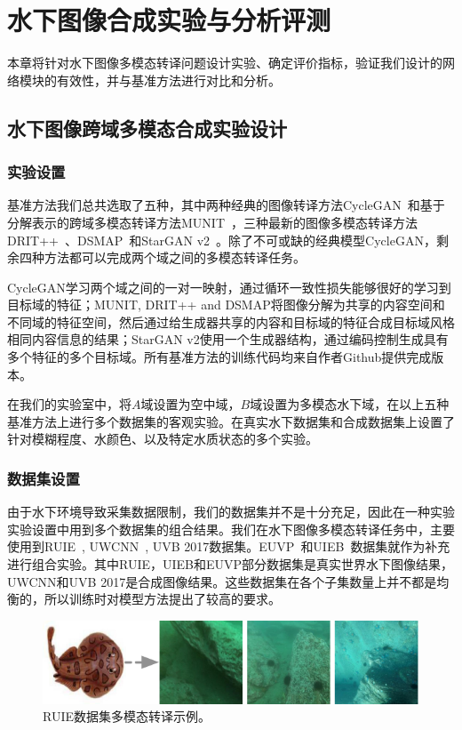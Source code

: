 \chapter{水下图像合成实验与分析评测}
本章将针对水下图像多模态转译问题设计实验、确定评价指标，验证我们设计的网络模块的有效性，并与基准方法进行对比和分析。

\section{水下图像跨域多模态合成实验设计}
\subsection{实验设置}
基准方法我们总共选取了五种，其中两种经典的图像转译方法CycleGAN~\citep{zhu2017unpaired}和基于分解表示的跨域多模态转译方法MUNIT~\citep{huang2018multimodal}，三种最新的图像多模态转译方法DRIT++~\citep{lee2020drit++}、DSMAP~\citep{chang2020domain}和StarGAN v2~\cite{choi2020stargan}。除了不可或缺的经典模型CycleGAN，剩余四种方法都可以完成两个域之间的多模态转译任务。

CycleGAN学习两个域之间的一对一映射，通过循环一致性损失能够很好的学习到目标域的特征；MUNIT, DRIT++ and DSMAP将图像分解为共享的内容空间和不同域的特征空间，然后通过给生成器共享的内容和目标域的特征合成目标域风格相同内容信息的结果；StarGAN v2使用一个生成器结构，通过编码控制生成具有多个特征的多个目标域。所有基准方法的训练代码均来自作者Github提供完成版本。

在我们的实验室中，将$A$域设置为空中域，$B$域设置为多模态水下域，在以上五种基准方法上进行多个数据集的客观实验。在真实水下数据集和合成数据集上设置了针对模糊程度、水颜色、以及特定水质状态的多个实验。

\subsection{数据集设置}
由于水下环境导致采集数据限制，我们的数据集并不是十分充足，因此在一种实验实验设置中用到多个数据集的组合结果。我们在水下图像多模态转译任务中，主要使用到RUIE~\citep{liu2019real}, UWCNN~\citep{li2020underwater}, UVB 2017数据集。EUVP~\citep{islam2019fast}和UIEB~\citep{li2019underwater}数据集就作为补充进行组合实验。其中RUIE，UIEB和EUVP部分数据集是真实世界水下图像结果，UWCNN和UVB 2017是合成图像结果。这些数据集在各个子集数量上并不都是均衡的，所以训练时对模型方法提出了较高的要求。

\begin{figure}[htp]
    \centering
	\includegraphics[width=\textwidth]{figures/ruie-dataset.pdf}
	\caption{RUIE数据集多模态转译示例。}
	\label{fig:ruie_dataset}
\end{figure}

